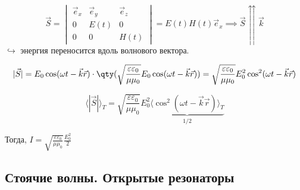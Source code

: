 \begin{equation*}
	\vec{S} = \begin{vmatrix} \vec{e}_x & \vec{e}_y & \vec{e}_z \\ 0 & E(t) & 0 \\ 0 & 0 & H(t) \end{vmatrix} = E(t)H(t)\vec{e}_x \implies \vec{S} \upuparrows \vec{k}
\end{equation*}
$\hookrightarrow$ энергия переносится вдоль волнового вектора.

\begin{equation*}
	|\vec{S}| = E_0 \cos(\omega t - \vec{k}\vec{r}) \cdot \qty( \sqrt{\frac{\varepsilon\varepsilon_0}{\mu\mu_0}} E_0 \cos(\omega t - \vec{k}\vec{r}) ) = \sqrt{\frac{\varepsilon\varepsilon_0}{\mu\mu_0}} E_0^2 \cos^2(\omega t - \vec{k}\vec{r})
\end{equation*}

\begin{equation*}
	\langle |\vec{S}| \rangle_T = \sqrt{\frac{\varepsilon\varepsilon_0}{\mu\mu_0}} E_0^2 \underbrace{\langle \cos^2(\omega t - \vec{k}\vec{r}) \rangle_T}_{1/2}
\end{equation*}

Тогда, $I = \sqrt{\frac{\varepsilon\varepsilon_0}{\mu\mu_0}} \frac{E_0^2}{2}$

\subsection{Стоячие волны. Открытые резонаторы}

